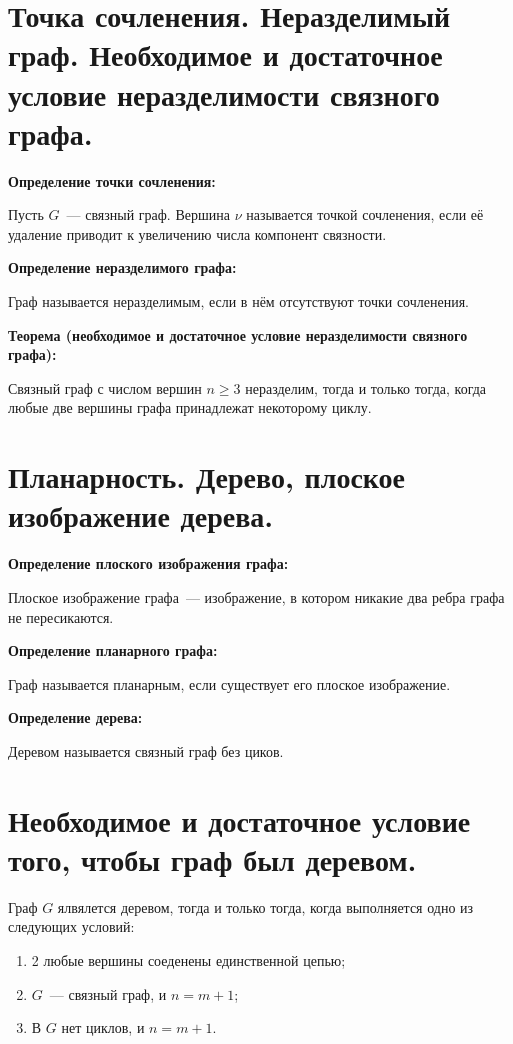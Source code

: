 \section{Точка сочленения. Неразделимый граф. Необходимое и достаточное условие
неразделимости связного графа.}

\textbf{Определение точки сочленения:}
    \smallskip

    Пусть $G$~--- связный граф. Вершина $\nu$ называется точкой сочленения,
    если её удаление приводит к увеличению числа компонент связности.
    \bigskip

\textbf{Определение неразделимого графа:}
    \smallskip
    
    Граф называется неразделимым, если в нём отсутствуют точки сочленения.
    \bigskip

\textbf{Теорема (необходимое и достаточное условие неразделимости связного
графа):}
    \smallskip
    
    Связный граф с числом вершин $n \geq 3$ неразделим, тогда и только тогда,
    когда любые две вершины графа принадлежат некоторому циклу.

\section{Планарность. Дерево, плоское изображение дерева.}

\textbf{Определение плоского изображения графа:}
    \smallskip

    Плоское изображение графа~--- изображение, в котором никакие два
    ребра графа не пересикаются.
    \bigskip

\textbf{Определение планарного графа:}
    \smallskip
    
    Граф называется планарным, если существует его плоское изображение.
    \bigskip

\textbf{Определение дерева:}
    \smallskip
    
    Деревом называется связный граф без циков.
    \bigskip

\section{Необходимое и достаточное условие того, чтобы граф был деревом.}

Граф $G$ ялвялется деревом, тогда и только тогда, когда выполняется одно из
следующих условий:

\begin{enumerate}
    \item{2 любые вершины соеденены единственной цепью;}
    \item{$G$~--- связный граф, и $n = m + 1$;}
    \item{В $G$ нет циклов, и $n = m + 1$.}
\end{enumerate}
\bigskip

